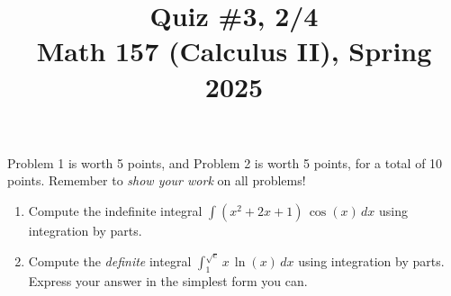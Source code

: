 \documentclass[11pt]{article}
\title{Quiz \#3, 2/4 \\ Math 157 (Calculus II), Spring 2025}
\date{}
\begin{document}
\maketitle

\thispagestyle{empty}

\vspace{-2cm}

Problem 1 is worth 5 points, and Problem 2 is worth 5 points, for a total of 10 points. Remember to \emph{show your work} on all problems!

\begin{enumerate}
\item Compute the indefinite integral $\displaystyle \int (x^2+2x+1) \, \cos(x) \, dx$ using integration by parts.

\vspace{8cm}

\item Compute the \emph{definite} integral $\displaystyle \int_{1}^{\sqrt{e}} x \, \ln(x) \, dx$ using integration by parts. Express your answer in the simplest form you can.

\end{enumerate}
\end{document}
